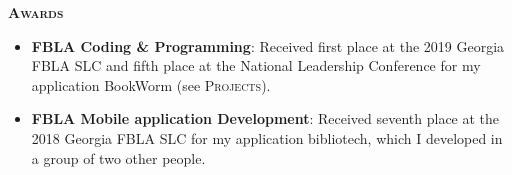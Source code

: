 \documentclass{article}
\begin{document}
  \vspace{10pt}

  {\large \textbf{\textsc{Awards}}}\hspace{5pt}\xrfill[.5ex]{.4pt}

  \vspace{3pt}

  \begin{itemize}
    \item \textbf{FBLA Coding \& Programming}: Received first place at the 2019 Georgia FBLA SLC and fifth place at the National Leadership Conference for my application BookWorm (see \textsc{Projects}).
    \item \textbf{FBLA Mobile application Development}: Received seventh place at the 2018 Georgia FBLA SLC for my application bibliotech, which I developed in a group of two other people.
  \end{itemize}

  \vspace{10pt}
\end{document}

